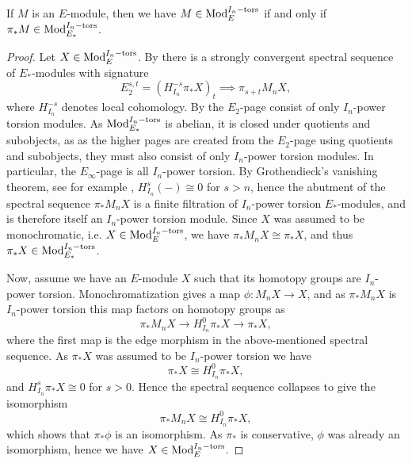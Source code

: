\begin{lemma}
    \label{ch1:lm:monochromatic-iff-torsion-modules}
    If $M$ is an $E$-module, then we have $M\in \mathrm{Mod}_{E}^{I_n-\mathrm{tors}}$ if and only if $\pi_* M\in \mathrm{Mod}_{E_*}^{I_n-\mathrm{tors}}$. 
\end{lemma}
\begin{proof}
    Let $X\in \mathrm{Mod}_{E}^{I_n-\mathrm{tors}}$. By \cite[3.19]{barthel-heard-valenzuela_2018} there is a strongly convergent spectral sequence of $E_*$-modules with signature 
    \[E_2^{s,t} = (H_{I_n}^{-s}\pi_* X)_t \implies \pi_{s+t}M_n X,\]
    where $H_{I_n}^{-s}$ denotes local cohomology. By \cite[2.1.3(ii)]{brodmann-sharp_1998} the $E_2$-page consist of only $I_n$-power torsion modules. As $\mathrm{Mod}_{E_*}^{I_n-\mathrm{tors}}$ is abelian, it is closed under quotients and subobjects, as as the higher pages are created from the $E_2$-page using quotients and subobjects, they must also consist of only $I_n$-power torsion modules. In particular, the $E_\infty$-page is all $I_n$-power torsion. By Grothendieck's vanishing theorem, see for example \cite[6.1.2]{brodmann-sharp_1998}, $H_{I_n}^s(-)\cong 0$ for $s>n$, hence the abutment of the spectral sequence $\pi_* M_n X$ is a finite filtration of $I_n$-power torsion $E_*$-modules, and is therefore itself an $I_n$-power torsion module. Since $X$ was assumed to be monochromatic, i.e. $X\in \mathrm{Mod}_{E}^{I_n-\mathrm{tors}}$, we have $\pi_* M_n X\cong \pi_* X$, and thus $\pi_* X\in \mathrm{Mod}_{E_*}^{I_n-\mathrm{tors}}$. 

    Now, assume we have an $E$-module $X$ such that its homotopy groups are $I_n$-power torsion. Monochromatization gives a map $\phi\colon M_n X\longrightarrow X$, and as $\pi_*M_nX$ is $I_n$-power torsion this map factors on homotopy groups as 
    \[\pi_* M_n X\longrightarrow H^0_{I_n}\pi_* X\longrightarrow \pi_* X,\]
    where the first map is the edge morphism in the above-mentioned spectral sequence. As $\pi_* X$ was assumed to be $I_n$-power torsion we have 
    \[\pi_*X\cong H^0_{I_n}\pi_* X,\] 
    and $H^s_{I_n}\pi_* X \cong 0$ for $s>0$. Hence the spectral sequence collapses to give the isomorphism 
    \[\pi_* M_n X\cong H^0_{I_n}\pi_* X,\] 
    which shows that $\pi_* \phi$ is an isomorphism. As $\pi_*$ is conservative, $\phi$ was already an isomorphism, hence we have $X\in \mathrm{Mod}_{E}^{I_n-\mathrm{tors}}$. 
\end{proof}

